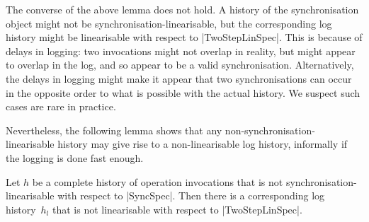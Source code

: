 
The converse of the above lemma does not hold.  A history of the
synchronisation object might not be synchronisation-linearisable, but the
corresponding log history might be linearisable with respect to
|TwoStepLinSpec|.  This is because of delays in logging: two invocations might
not overlap in reality, but might appear to overlap in the log, and so appear
to be a valid synchronisation.  Alternatively, the delays in logging might
make it appear that two synchronisations can occur in the opposite order to
what is possible with the actual history.  We suspect such cases are rare in
practice.

Nevertheless, the following lemma shows that any non-synchronisation-linearisable
history may give rise to a non-linearisable log history, informally if the
logging is done fast enough. 
\begin{lemma}
\label{lem:hacking-can-succeed}
Let $h$ be a complete  history of operation invocations that is not
synchronisation-linearisable with respect to |SyncSpec|.  Then there is a
corresponding log history~$h_l$ that is not linearisable with respect to
|TwoStepLinSpec|.
\end{lemma}
%
